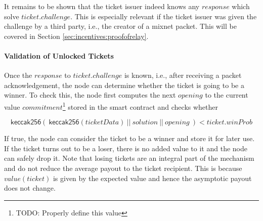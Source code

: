 It remains to be shown that the ticket issuer indeed knows any $response$ which solve $ticket.challenge$. This is especially relevant if the ticket issuer was given the challenge by a third party, i.e., the creator of a mixnet packet. This will be covered in Section \ref{sec:incentives:proofofrelay}.

\paragraph{Validation of Unlocked Tickets}
\label{sec:tickets:validation:unlocked}

Once the $response$ to $ticket.challenge$ is known, i.e., after receiving a packet acknowledgement, the node can determine whether the ticket is going to be a winner. To check this, the node first computes the next $opening$ to the current value $commitment$\footnote{TODO: Properly define this value} stored in the smart contract and checks whether

$$ \mathsf{keccak256} ( \ \mathsf{keccak256}(ticketData) \ || \ solution \ || \ opening \ ) < ticket.winProb $$

If true, the node can consider the ticket to be a winner and store it for later use. If the ticket turns out to be a loser, there is no added value to it and the node can safely drop it. Note that losing tickets are an integral part of the mechanism and do not reduce the average payout to the ticket recipient. This is because $value(ticket)$ is given by the expected value and hence the asymptotic payout does not change.